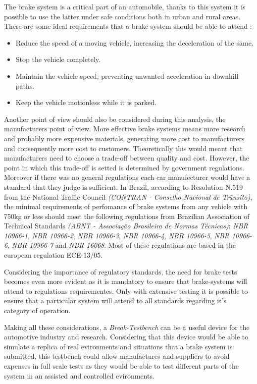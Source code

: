 		The brake system is a critical part of an automobile, thanks to this system it is possible to use the latter under safe conditions both in urban and rural areas. There are some ideal requirements that a brake system should be able to attend \cite{kawaguchi}:

		\begin{itemize}
			\item Reduce the speed of a moving vehicle, increasing the deceleration of the same.
			\item Stop the vehicle completely.
			\item Maintain the vehicle speed, preventing unwanted acceleration in downhill paths.
			\item Keep the vehicle motionless while it is parked.
		\end{itemize}

		\par
		Another point of view should also be considered during this analysis, the manufacturers point of view. More effective brake systems means more research and probably more expensive materials, generating more cost to manufacturers and consequently more cost to customers. Theoretically this would meant that manufacturers need to choose a trade-off between quality and cost. However, the point in which this trade-off is setted is determined by government regulations. Moreover if there was no general regulations each car manufecturer would have a standard that they judge is sufficient. In Brazil, according to Resolution N.519 \cite{contran519} from the National Traffic Council \textit{(CONTRAN - Conselho Nacional de Trânsito)}, the minimal requirements of perfomance of brake systems from any vehicle with 750kg or less should meet the following regulations from Brazilian Association of Technical Standards \textit{(ABNT - Associação Brasileira de Normas Técnicas)}: \textit{NBR 10966-1}, \textit{NBR 10966-2}, \textit{NBR 10966-3}, \textit{NBR 10966-4}, \textit{NBR 10966-5}, \textit{NBR 10966-6}, \textit{NBR 10966-7} and \textit{NBR 16068}. Most of these regulations are based in the european regulation ECE-13/05.
		\par
		Considering the importance of regulatory standards, the need for brake tests becomes even more evident as it is mandatory to ensure that brake-systems will attend to regulations requirementes. Only with extensive testing it is possible to ensure that a particular system will attend to all standards regarding it's category of operation. 
		\par
		Making all these considerations, a \textit{Break-Testbench} can be a useful device for the automotive industry and research. Considering that this device would be able to simulate a replica of real evironments and situations that a brake system is submitted, this testbench could allow manufactures and suppliers to avoid expenses in full scale tests as they would be able to test different parts of the system in an assisted and controlled evironments.